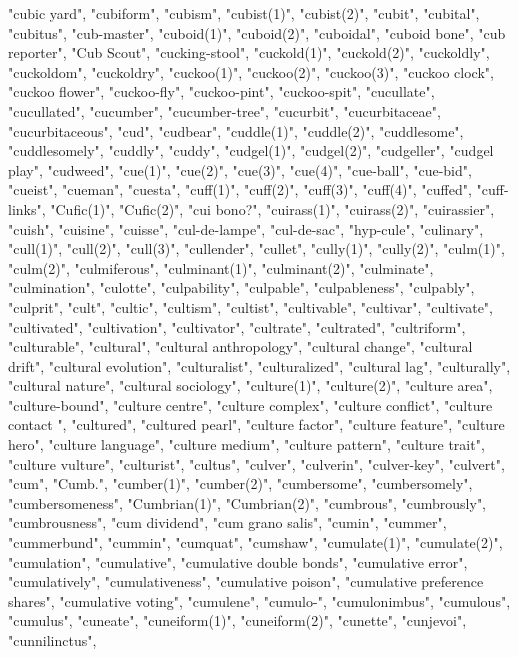 "cubic yard",
"cubiform",
"cubism",
"cubist(1)",
"cubist(2)",
"cubit",
"cubital",
"cubitus",
"cub-master",
"cuboid(1)",
"cuboid(2)",
"cuboidal",
"cuboid bone",
"cub reporter",
"Cub Scout",
"cucking-stool",
"cuckold(1)",
"cuckold(2)",
"cuckoldly",
"cuckoldom",
"cuckoldry",
"cuckoo(1)",
"cuckoo(2)",
"cuckoo(3)",
"cuckoo clock",
"cuckoo flower",
"cuckoo-fly",
"cuckoo-pint",
"cuckoo-spit",
"cucullate",
"cucullated",
"cucumber",
"cucumber-tree",
"cucurbit",
"cucurbitaceae",
"cucurbitaceous",
"cud",
"cudbear",
"cuddle(1)",
"cuddle(2)",
"cuddlesome",
"cuddlesomely",
"cuddly",
"cuddy",
"cudgel(1)",
"cudgel(2)",
"cudgeller",
"cudgel play",
"cudweed",
"cue(1)",
"cue(2)",
"cue(3)",
"cue(4)",
"cue-ball",
"cue-bid",
"cueist",
"cueman",
"cuesta",
"cuff(1)",
"cuff(2)",
"cuff(3)",
"cuff(4)",
"cuffed",
"cuff-links",
"Cufic(1)",
"Cufic(2)",
"cui bono?",
"cuirass(1)",
"cuirass(2)",
"cuirassier",
"cuish",
"cuisine",
"cuisse",
"cul-de-lampe",
"cul-de-sac",
"hyp-cule",
"culinary",
"cull(1)",
"cull(2)",
"cull(3)",
"cullender",
"cullet",
"cully(1)",
"cully(2)",
"culm(1)",
"culm(2)",
"culmiferous",
"culminant(1)",
"culminant(2)",
"culminate",
"culmination",
"culotte",
"culpability",
"culpable",
"culpableness",
"culpably",
"culprit",
"cult",
"cultic",
"cultism",
"cultist",
"cultivable",
"cultivar",
"cultivate",
"cultivated",
"cultivation",
"cultivator",
"cultrate",
"cultrated",
"cultriform",
"culturable",
"cultural",
"cultural anthropology",
"cultural change",
"cultural drift",
"cultural evolution",
"culturalist",
"culturalized",
"cultural lag",
"culturally",
"cultural nature",
"cultural sociology",
"culture(1)",
"culture(2)",
"culture area",
"culture-bound",
"culture centre",
"culture complex",
"culture conflict",
"culture contact ",
"cultured",
"cultured pearl",
"culture factor",
"culture feature",
"culture hero",
"culture language",
"culture medium",
"culture pattern",
"culture trait",
"culture vulture",
"culturist",
"cultus",
"culver",
"culverin",
"culver-key",
"culvert",
"cum",
"Cumb.",
"cumber(1)",
"cumber(2)",
"cumbersome",
"cumbersomely",
"cumbersomeness",
"Cumbrian(1)",
"Cumbrian(2)",
"cumbrous",
"cumbrously",
"cumbrousness",
"cum dividend",
"cum grano salis",
"cumin",
"cummer",
"cummerbund",
"cummin",
"cumquat",
"cumshaw",
"cumulate(1)",
"cumulate(2)",
"cumulation",
"cumulative",
"cumulative double bonds",
"cumulative error",
"cumulatively",
"cumulativeness",
"cumulative poison",
"cumulative preference shares",
"cumulative voting",
"cumulene",
"cumulo-",
"cumulonimbus",
"cumulous",
"cumulus",
"cuneate",
"cuneiform(1)",
"cuneiform(2)",
"cunette",
"cunjevoi",
"cunnilinctus",
